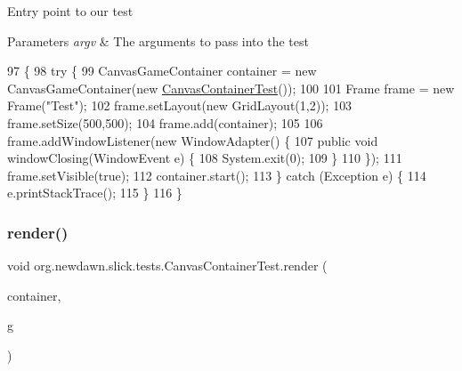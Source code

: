 Entry point to our test


\begin{DoxyParams}{Parameters}
{\em argv} & The arguments to pass into the test \\
\hline
\end{DoxyParams}

\begin{DoxyCode}
97                                            \{
98         \textcolor{keywordflow}{try} \{
99             CanvasGameContainer container = \textcolor{keyword}{new} CanvasGameContainer(\textcolor{keyword}{new} 
      \mbox{\hyperlink{classorg_1_1newdawn_1_1slick_1_1tests_1_1_canvas_container_test_a480a57af5c31bc5fdbc74ac3b52084fa}{CanvasContainerTest}}());
100             
101             Frame frame = \textcolor{keyword}{new} Frame(\textcolor{stringliteral}{"Test"});
102             frame.setLayout(\textcolor{keyword}{new} GridLayout(1,2));
103             frame.setSize(500,500);
104             frame.add(container);
105             
106             frame.addWindowListener(\textcolor{keyword}{new} WindowAdapter() \{
107                 \textcolor{keyword}{public} \textcolor{keywordtype}{void} windowClosing(WindowEvent e) \{
108                     System.exit(0);
109                 \}
110             \});
111             frame.setVisible(\textcolor{keyword}{true});
112             container.start();
113         \} \textcolor{keywordflow}{catch} (Exception e) \{
114             e.printStackTrace();
115         \}
116     \}
\end{DoxyCode}
\mbox{\label{classorg_1_1newdawn_1_1slick_1_1tests_1_1_canvas_container_test_a6914f065b8661cb74a658d3a31d70766}} 
\subsubsection{\texorpdfstring{render()}{render()}}
{\footnotesize\ttfamily void org.\+newdawn.\+slick.\+tests.\+Canvas\+Container\+Test.\+render (\begin{DoxyParamCaption}\item[{\mbox{\hyperlink{classorg_1_1newdawn_1_1slick_1_1_game_container}{Game\+Container}}}]{container,  }\item[{\mbox{\hyperlink{classorg_1_1newdawn_1_1slick_1_1_graphics}{Graphics}}}]{g }\end{DoxyParamCaption})\hspace{0.3cm}{\ttfamily [inline]}}

